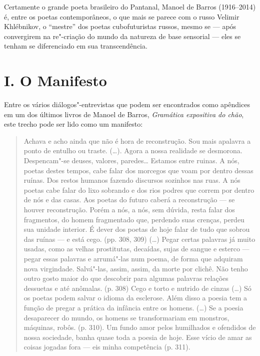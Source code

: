 
Certamente o grande poeta brasileiro do Pantanal, Manoel de Barros
(1916--2014) é, entre os poetas contemporâneos, o que mais se parece
com o russo Velimir Khlébnikov, o ``mestre'' dos poetas cubofuturistas
russos, mesmo se --- após convergirem na re"-criação do mundo da natureza
de base sensorial --- eles se tenham se diferenciado em sua
transcendência.

\section{I. O Manifesto}

Entre os vários diálogos"-entrevistas que podem ser encontrados como
apêndices em um dos últimos livros de Manoel de Barros, \emph{Gramática
expositiva do chão}, este trecho
pode ser lido como um manifesto:

\begin{quote}
Achava e acho ainda que não é hora de reconstrução. Sou mais apalavra a
ponto de entulho ou traste. (\ldots{}). Agora a nossa realidade se desmorona.
Despencam"-se deuses, valores, paredes\ldots{} Estamos entre ruinas. A nós,
poetas destes tempos, cabe falar dos morcegos que voam por dentro dessas
ruínas. Dos restos humanos fazendo discursos sozinhos nas ruas. A nós
poetas cabe falar do lixo sobrando e dos rios podres que correm por
dentro de nós e das casas. Aos poetas do futuro caberá a reconstrução ---
se houver reconstrução. Porém a nós, a nós, sem dúvida, resta falar
dos fragmentos, do homem fragmentado que, perdendo suas crenças, perdeu
sua unidade interior. É dever dos poetas de hoje falar de tudo que
sobrou das ruínas --- e está cego. (pp. 308, 309) (\ldots{}) Pegar certas
palavras já muito usadas, como as velhas prostitutas, decaídas, sujas de
sangue e esterco --- pegar essas palavras e arrumá"-las num poema, de
forma que adquiram nova virgindade. Salvá"-las, assim, assim, da morte
por clichê. Não tenho outro gosto maior do que descobrir para algumas
palavras relações dessuetas e até anômalas. (p. 308) Cego e torto e
nutrido de cinzas (\ldots{}) Só os poetas podem salvar o idioma da esclerose.
Além disso a poesia tem a função de pregar a prática da infância entre
os homens. (\ldots{}) Se a poesia desaparecer do mundo, os homens se
transformariam em monstros, máquinas, robôs. (p. 310). Um fundo amor
pelos humilhados e ofendidos de nossa sociedade, banha quase toda a
poesia de hoje. Esse vício de amar as coisas jogadas fora --- eis minha
competência (p. 311).
\end{quote}

